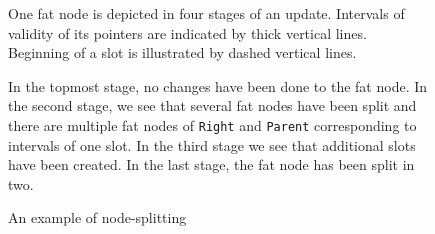 \begin{figure}
\begin{center}
\vspace{10mm}

\caption{An example of node-splitting}
\end{center}
One fat node is depicted in four stages of an update. Intervals of validity of its pointers are indicated by thick vertical lines. Beginning of a slot is illustrated by dashed vertical lines.

In the topmost stage, no changes have been done to the fat node. In the second stage, we see that several fat nodes have been split and there are multiple fat nodes of {\tt Right} and {\tt Parent} corresponding to intervals of one slot. In the third stage we see that additional slots have been created. In the last stage, the fat node has been split in two.
\end{figure}